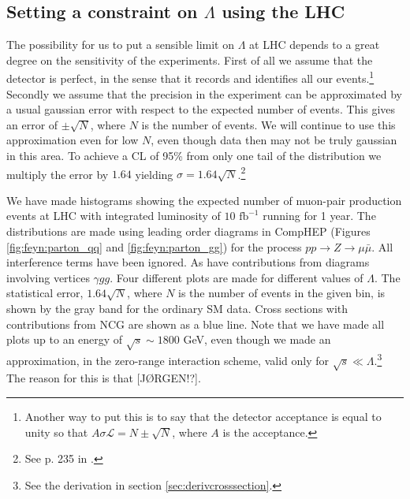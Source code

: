 \subsection{Setting a constraint on $\Lambda$ using the LHC}
The possibility for us to put a sensible limit on $\Lambda$ at LHC depends to a great degree on the sensitivity of the experiments. First of all we assume that the detector is perfect, in the sense that it records and identifies all our events.\footnote{Another way to put this is to say that the detector acceptance is equal to unity so that $A\sigma \mathcal{L} = N \pm \sqrt{N}$, where $A$ is the acceptance.} Secondly we assume that the precision in the experiment can be approximated by a usual gaussian error with respect to the expected number of events. This gives an error of $\pm \sqrt{N}$, where $N$ is the number of events. We will continue to use this approximation even for low $N$, even though data then may not be truly gaussian in this area. To achieve a CL of 95\% from only one tail of the distribution we multiply the error by $1.64$ yielding $\sigma = 1.64 \sqrt{N}$.\footnote{See p. 235 in \cite{hagiwara2002rpp}.}

We have made histograms showing the expected number of muon-pair production events at LHC with integrated luminosity of $10 \textrm{ fb}^{-1}$ running for 1 year. The distributions are made using leading order diagrams in CompHEP (Figures \ref{fig:feyn:parton_qq} and \ref{fig:feyn:parton_gg}) for the process $pp \rightarrow Z \rightarrow \mu \bar \mu$. All interference terms have been ignored. As have contributions from diagrams involving vertices $\gamma gg$. Four different plots are made for different values of $\Lambda$. The statistical error, $1.64\sqrt{N}$, where $N$ is the number of events in the given bin, is shown by the gray band for the ordinary SM data. Cross sections with contributions from NCG are shown as a blue line. Note that we have made all plots up to an energy of $\sqrt{s} \sim 1800$ GeV, even though we made an approximation, in the zero-range interaction scheme, valid only for $\sqrt{s} \ll \Lambda$.\footnote{See the derivation in section \ref{sec:derivcrosssection}.} The reason for this is that [JØRGEN!?].

